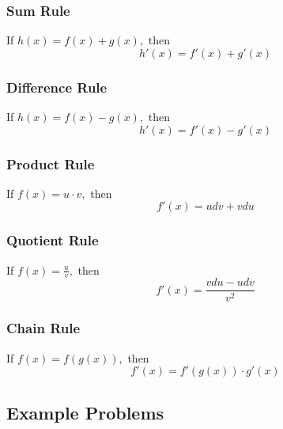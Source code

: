\documentclass[hidelinks, a4paper, 12pt]{article}
\begin{document}
            \subsubsection{Sum Rule}
                If $h(x) = f(x) + g(x),$ then
                \[h'(x) = f'(x) + g'(x)\]
            \subsubsection{Difference Rule}
                If $h(x) = f(x) - g(x),$ then
                \[h'(x) = f'(x) - g'(x)\]
            \subsubsection{Product Rule}
                If $f(x) = u\cdot v,$ then
                \[f'(x) = udv + vdu\]
            \subsubsection{Quotient Rule}
                If $f(x) = \frac{u}{v},$ then
                \[f'(x) = \frac{vdu - udv}{v^2}\]
            \subsubsection{Chain Rule}
                If $f(x) = f(g(x)),$ then
                \[f'(x) = f'(g(x))\cdot g'(x)\]
        \subsection{Example Problems}
\end{document}
